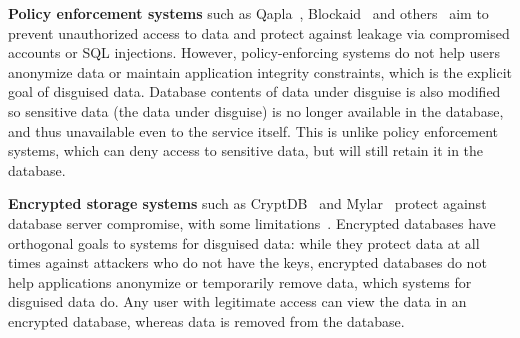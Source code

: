 \textbf{Policy enforcement systems} such as Qapla~\cite{qapla},
Blockaid~\cite{blockaid} and others~\cite{static, jeeves, jif, hails, ifdb,
oracle, multiverse, sieve} aim to prevent unauthorized access to data and
protect against leakage via compromised accounts or SQL injections. 
%
However, policy-enforcing systems do not help users anonymize data or maintain
application integrity constraints, which is the explicit
goal of disguised data.
%
Database contents of data under disguise is also modified so sensitive data (the
data under disguise) is no longer available in the database, and thus
unavailable even to the service itself. This is unlike policy enforcement
systems, which can deny access to sensitive data, but will still retain it in the database.
%

\textbf{Encrypted storage systems} such as CryptDB~\cite{cryptdb} and
Mylar~\cite{mylar} protect against database server compromise, with some
limitations~\cite{grubbs}.
%
%
%
Encrypted databases have orthogonal goals to systems for disguised data: while they protect data at all times
against attackers who do not have the keys, encrypted databases do not help applications
anonymize or temporarily remove data, which systems for disguised data do.
%
Any user with legitimate access can view the data in an encrypted database,
whereas \xxed data is removed from the database.

